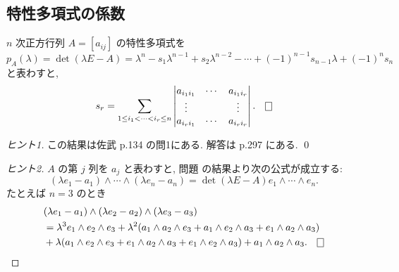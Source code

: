 \documentclass[12pt,twoside]{jarticle}
\begin{document}
\subsection{特性多項式の係数}

\begin{question}[特性多項式の係数]
  \label{q:char-polyn-coeff}
  $n$ 次正方行列 $A=[a_{ij}]$ の特性多項式を
  \begin{equation*}
    p_A(\lambda) 
    = \det(\lambda E - A)
    = \lambda^n - s_1\lambda^{n-1} + s_2\lambda^{n-2} 
    - \cdots + (-1)^{n-1} s_{n-1}\lambda + (-1)^n s_n
  \end{equation*}
  と表わすと, 
  \begin{equation*}
    s_r = 
    \sum_{1\le i_1<\cdots<i_r\le n}
    \begin{vmatrix}
      a_{i_1i_1} & \cdots & a_{i_1i_r} \\
      \vdots     &        & \vdots \\
      a_{i_ri_1} & \cdots & a_{i_ri_r} \\
    \end{vmatrix}.
    \qed
  \end{equation*}
\end{question}

\begin{proof}[ヒント1]
  この結果は佐武 \cite{satake} p.134 の問1にある.
  解答は p.297 にある. \qed
\end{proof}

\begin{proof}[ヒント2]
  $A$ の第 $j$ 列を $a_j$ と表わすと, 
  問題  の結果より次の公式が成立する:
  \begin{equation*}
    (\lambda e_1 - a_1)\wedge\cdots\wedge(\lambda e_n - a_n)
    = \det(\lambda E - A) e_1\wedge\cdots\wedge e_n.
  \end{equation*}
  たとえば $n=3$ のとき
  \begin{align*}
    &
    (\lambda e_1 - a_1)\wedge(\lambda e_2 - a_2)\wedge(\lambda e_3 - a_3) 
    \\ &
    = \lambda^3 e_1\wedge e_2\wedge e_3
    + \lambda^2
    (a_1\wedge a_2\wedge e_3+a_1\wedge e_2\wedge a_3+e_1\wedge a_2\wedge a_3)
    \\ &
    + \lambda
    (a_1\wedge e_2\wedge e_3+e_1\wedge a_2\wedge a_3+e_1\wedge e_2\wedge a_3)
    + a_1\wedge a_2\wedge a_3.
    \qed
  \end{align*}
\end{proof}

\end{document}
